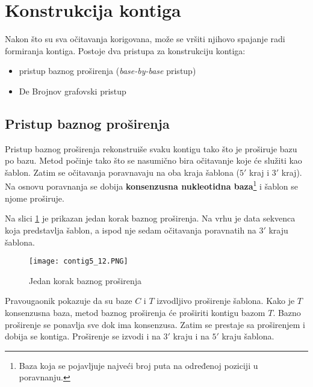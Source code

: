 \documentclass[12pt,oneside]{memoir}
\begin{document}
\section{Konstrukcija kontiga}
\label{poglavlje:KonstrukcijaKontiga}

Nakon što su sva očitavanja korigovana, može se vršiti njihovo spajanje radi formiranja kontiga. Postoje dva pristupa za konstrukciju kontiga:
\begin{itemize}
\itemsep0em 
    \item{pristup baznog proširenja (\textit{base-by-base} pristup)}
    \item{De Brojnov grafovski pristup}
\end{itemize}

\subsection{Pristup baznog proširenja}

Pristup baznog proširenja rekonstruiše svaku kontigu tako što je proširuje bazu po bazu. Metod počinje tako što se nasumično bira očitavanje koje će služiti kao šablon. Zatim se očitavanja poravnavaju na oba kraja šablona ($5'$ kraj i $3'$ kraj). Na osnovu poravnanja se dobija \textbf{konsenzusna nukleotidna baza}\footnote{Baza koja se pojavljuje najveći broj puta na određenoj poziciji u poravnanju.} i šablon se njome proširuje.

Na slici \ref{fig:7} je prikazan jedan korak baznog proširenja.
Na vrhu je data sekvenca koja predstavlja šablon, a ispod nje sedam očitavanja poravnatih na $3'$ kraju šablona.

\begin{figure}[!ht]
  \centering
  \texttt{[image: contig5\_12.PNG]}
\caption{Jedan korak baznog proširenja \cite{WingKinSung}}
\label{fig:7}
\end{figure}

\noindent Pravougaonik pokazuje da su baze $C$ i $T$ izvodljivo proširenje šablona. Kako je $T$ konsenzusna baza, metod baznog proširenja će proširiti kontigu bazom $T$. Bazno proširenje se ponavlja sve dok ima konsenzusa. Zatim se prestaje sa proširenjem i dobija se kontiga. Proširenje se izvodi i na $3'$ kraju i na $5'$ kraju šablona.

\begin{comment}
Slika \ref{fig:8} daje pseudokod ovog metoda.

\begin{figure}[!ht]
\centering
\texttt{[image: SimpleAsembler5\_13.PNG]}
\caption{Jednostavan base-by-base asembler proširenja \cite{WingKinSung}} 
\label{fig:8}
\end{figure}

\end{comment}
\end{document}
